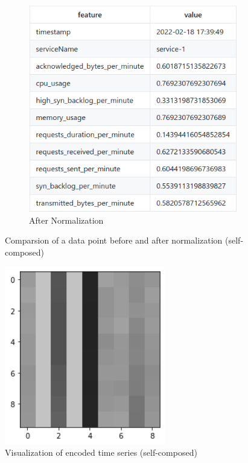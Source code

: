 \begin{figure}[H]
\begin{subfigure}[b]{0.49\textwidth}
        \includegraphics[width=\textwidth]{assets/implementation/after-normalization.png}
        \caption{After Normalization}
        \label{fig:after-normalization}
    \end{subfigure}
    \hfill
       \caption{Comparsion of a data point before and after normalization (self-composed)}
\end{figure}

\begin{figure}[H]
    \includegraphics[width=7cm]{assets/implementation/visualize-representation.png}
    \caption{Visualization of encoded time series (self-composed)}
    \label{fig:visualize-representation}
\end{figure}
